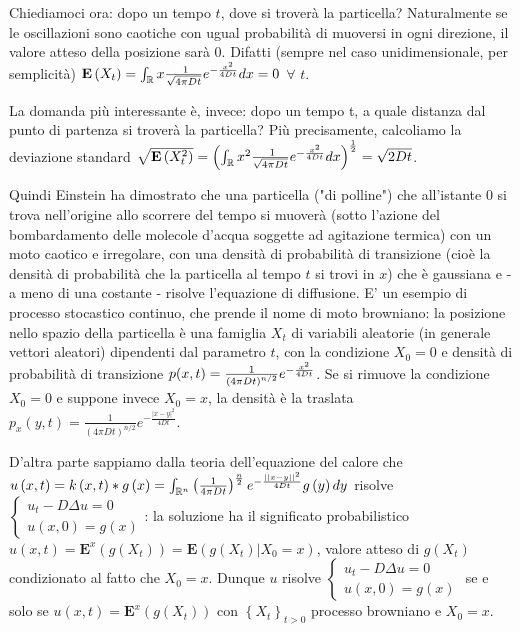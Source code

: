 \documentclass{article}
\begin{document}
Chiediamoci ora: dopo un tempo $t$, dove si trover\`{a} la particella?
Naturalmente se le oscillazioni sono caotiche con ugual probabilit\`{a} di
muoversi in ogni direzione, il valore atteso della posizione sar\`{a} 0.
Difatti (sempre nel caso unidimensionale, per semplicit\`{a}) $\mathbf{E}%
\left( X_{t}\right) =\int_{%
\mathbb{R}
}x\frac{\text{ }1}{\sqrt{4\pi Dt}}e^{-\frac{x^{2}}{4Dt}}dx=0$ $\forall $ $t$.

La domanda pi\`{u} interessante \`{e}, invece: dopo un tempo t, a quale
distanza dal punto di partenza si trover\`{a} la particella? Pi\`{u}
precisamente, calcoliamo la deviazione standard $\sqrt{\mathbf{E}\left(
X_{t}^{2}\right) }=\left( \int_{%
\mathbb{R}
}x^{2}\frac{\text{ }1}{\sqrt{4\pi Dt}}e^{-\frac{x^{2}}{4Dt}}dx\right) ^{%
\frac{1}{2}}=\sqrt{2Dt}$.

Quindi Einstein ha dimostrato che una particella ("di polline") che
all'istante $0$ si trova nell'origine allo scorrere del tempo si muover\`{a}
(sotto l'azione del bombardamento delle molecole d'acqua soggette ad
agitazione termica) con un moto caotico e irregolare, con una densit\`{a} di
probabilit\`{a} di transizione (cio\`{e} la densit\`{a} di probabilit\`{a}
che la particella al tempo $t$ si trovi in $x$) che \`{e} gaussiana e - a
meno di una costante - risolve l'equazione di diffusione. E' un esempio di
processo stocastico continuo, che prende il nome di moto browniano: la
posizione nello spazio della particella \`{e} una famiglia $X_{t}$ di
variabili aleatorie (in generale vettori aleatori) dipendenti dal parametro $%
t$, con la condizione $X_{0}=0$ e densit\`{a} di probabilit\`{a} di
transizione $p(x,t)=\frac{1}{\left( 4\pi Dt\right) ^{n/2}}e^{-\frac{x^{2}}{%
4Dt}}$. Se si rimuove la condizione $X_{0}=0$ e suppone invece $X_{0}=x$, la
densit\`{a} \`{e} la traslata $p_{x}\left( y,t\right) =\frac{1}{\left( 4\pi
Dt\right) ^{n/2}}e^{-\frac{\left\vert x-y\right\vert ^{2}}{4Dt}}$.

D'altra parte sappiamo dalla teoria dell'equazione del calore che $u\left(
x,t\right) =k\left( x,t\right) \ast g\left( x\right) =\int_{%
\mathbb{R}
^{n}}\left( \frac{1}{4\pi Dt}\right) ^{\frac{n}{2}}e^{-\frac{\left\vert
\left\vert x-y\right\vert \right\vert ^{2}}{4Dt}}g\left( y\right) dy$
risolve $\left\{ 
\begin{array}{c}
u_{t}-D\Delta u=0 \\ 
u\left( x,0\right) =g\left( x\right)%
\end{array}%
\right. $: la soluzione ha il significato probabilistico $u\left( x,t\right)
=\mathbf{E}^{x}\left( g\left( X_{t}\right) \right) =\mathbf{E}\left( g\left(
X_{t}\right) |X_{0}=x\right) $, valore atteso di $g\left( X_{t}\right) $
condizionato al fatto che $X_{0}=x$. Dunque $u$ risolve $\left\{ 
\begin{array}{c}
u_{t}-D\Delta u=0 \\ 
u\left( x,0\right) =g\left( x\right)%
\end{array}%
\right. $ se e solo se $u\left( x,t\right) =\mathbf{E}^{x}\left( g\left(
X_{t}\right) \right) $ con $\left\{ X_{t}\right\} _{t>0}$ processo browniano
e $X_{0}=x$.
\end{document}
